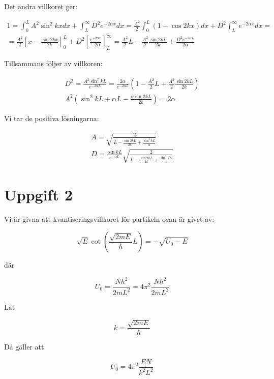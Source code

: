 \documentclass[12pt,a4paper]{article}
\begin{document}
Det andra villkoret ger:

\begin{gather*}
1=\int_0^LA^2\sin^2kxdx+\int_L^\infty D^2e^{-2\alpha x}dx=\frac{A^2}{2}\int_0^L(1-\cos2kx)dx+D^2\int_L^\infty e^{-2\alpha x}dx=\\
=\frac{A^2}{2}\left[x-\frac{\sin2kx}{2k}\right]^L_0+D^2\left[\frac{e^{-2\alpha x}}{-2\alpha}\right]_L^\infty=\frac{A^2}{2}L-\frac{A^2}{2}\frac{\sin2kL}{2k}+\frac{D^2e^{-2\alpha L}}{2\alpha}
\end{gather*}

Tillsammans följer av villkoren:

\begin{gather*}
D^2=\frac{A^2\sin^2kL}{e^{-2\alpha L}}=\frac{2\alpha}{e^{-2\alpha L}}\left(1-\frac{A^2}{2}L+\frac{A^2}{2}\frac{\sin2kL}{2k}\right) \\
A^2\left(\sin^2kL+\alpha L-\frac{\alpha\sin2kL}{2k}\right)=2\alpha
\end{gather*}

Vi tar de positiva lösningarna:

\begin{gather*}
A=\sqrt{\frac{2}{L-\frac{\sin2kL}{2k}+\frac{\sin^2kL}{\alpha}}} \\
D=\frac{\sin kL}{e^{-\alpha L}}\sqrt{\frac{2}{L-\frac{\sin2kL}{2k}+\frac{\sin^2kL}{\alpha}}}
\end{gather*}

\section*{Uppgift 2}

Vi är givna att kvantiseringsvillkoret för partikeln ovan är givet av:

\begin{equation*}
\sqrt{E}\cot\left(\frac{\sqrt{2mE}}{\hbar}L\right)=-\sqrt{U_0-E}
\end{equation*}

där

\begin{equation*}
U_0=\frac{Nh^2}{2mL^2}=4\pi^2\frac{N\hbar^2}{2mL^2}
\end{equation*}

Låt 

\begin{equation*}
k=\frac{\sqrt{2mE}}{\hbar}
\end{equation*}

Då gäller att

\begin{equation*}
U_0=4\pi^2\frac{EN}{k^2L^2}
\end{equation*}
\end{document}
